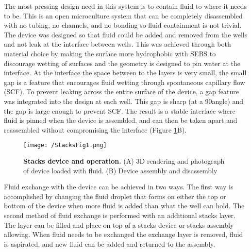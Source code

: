 The most pressing design need in this system is to contain fluid to where it needs to be. This is an open microculture system that can be completely disassembled with no tubing, no channels, and no bonding so fluid containment is not trivial. The device was designed so that fluid could be added and removed from the wells and not leak at the interface between wells. This was achieved through both material choice by making the surface more hydrophobic with SEBS to discourage wetting of surfaces and the geometry is designed to pin water at the interface. At the interface the space between to the layers is very small, the small gap is a feature that encourages fluid wetting through spontaneous capillary flow (SCF). To prevent leaking across the entire surface of the device, a gap feature was integrated into the design at each well. This gap is sharp (at a 90\degree angle) and the gap is large enough to prevent SCF. The result is a stable interface where fluid is pinned when the device is assembled, and can then be taken apart and reassembled without compromising the interface (Figure \ref{figure:StacksFig1}B).

\begin{figure}[h!] %
\centering
\texttt{[image: /StacksFig1.png]}
\caption[\textbf{Stacks device and operation}]{\textbf{Stacks device and operation.} (A) 3D rendering and photograph of device loaded with fluid. (B) Device assembly and disassembly}
\label{figure:StacksFig1}
\end{figure}


Fluid exchange with the device can be achieved in two ways. The first way is accomplished by changing the fluid droplet that forms on either the top or bottom of the device when more fluid is added than what the well can hold. The second method of fluid exchange is performed with an additional stacks layer. The layer can be filled and place on top of a stacks device or stacks assembly allowing. When fluid needs to be exchanged the exchange layer is removed, fluid is aspirated, and new fluid can be added and returned to the assembly.

